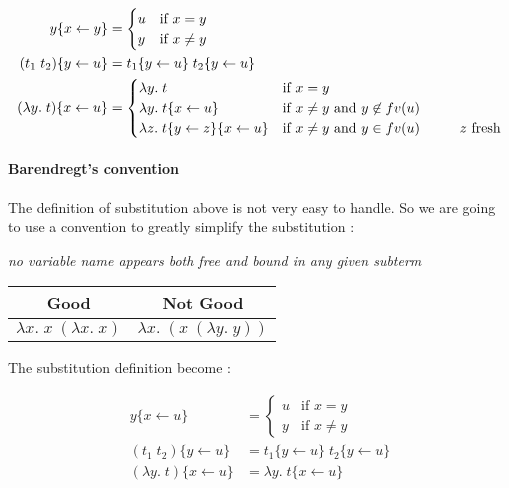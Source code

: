   \begin{align*}
    y\{x \leftarrow y\} &= \begin{cases}
      u & \text{if } x = y \\
      y & \text{if } x \not = y
    \end{cases} \\
    (t_1\; t_2)\{y \leftarrow u\} &= t_1\{y \leftarrow u\}\; t_2\{y \leftarrow
    u\} \\
    (\lambda y.\;t)\{x \leftarrow u\} &= \begin{cases}
      \lambda y.\;t &\text{if } x = y \\
      \lambda y.\;t\{x\leftarrow u\} &\text{if } x \not = y \text{ and } y \not
      \in fv(u)\\
      \lambda z.\;t\{y\leftarrow z\}\{x\leftarrow u\} &\text{if } x \not = y \text{ and } y \in
      fv(u) \text{\hspace{1cm}$z$ fresh}\\
    \end{cases}
  \end{align*}

  \paragraph{Barendregt's convention} The definition of substitution above is
  not very easy to handle. So we are going to use a convention to greatly
  simplify the substitution :

  \begin{center}
    \textit{no variable name appears both free and bound in any given subterm}
  \end{center}

  \begin{center}
    \begin{tabular}{c|c}
      Good & Not Good \\
      \hline
      $\lambda x.\;x\;(\lambda x.\;x)$ & $\lambda x.\;(x\;(\lambda y.\;y))$
    \end{tabular}
  \end{center}

  The substitution definition become :

  \begin{align*}
    y\{x \leftarrow u\} &= \begin{cases}
      u & \text{if } x = y \\
      y & \text{if } x \not = y
    \end{cases} \\
    (t_1\; t_2)\{y \leftarrow u\} &= t_1\{y \leftarrow u\}\; t_2\{y \leftarrow
    u\} \\
    (\lambda y.\;t)\{x \leftarrow u\} &= \lambda y.\; t\{x \leftarrow u\}
  \end{align*}


